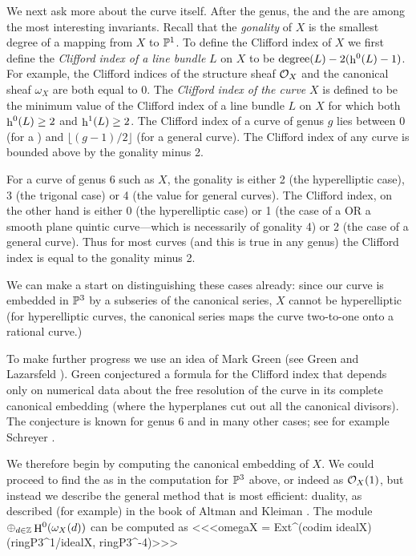 We next ask more about the curve itself. After the genus,
the  and the  are
among the most interesting invariants.
Recall that the
{\it gonality\/} of $X$ is the smallest degree of a mapping from
$X$ to $\P^1$. To define the Clifford index
of $X$ 
we first define the {\it Clifford index of a line bundle\/} $L$
on $X$ to be
$\mathop{\rm degree}(L)-2(\mathop{\rm h}\nolimits^0(L)-1)$.
{}For example, the Clifford indices of the structure sheaf
$\cO_X$ and the canonical sheaf $\omega_X$ are both equal to 0.
The {\it Clifford index of the curve\/} 
$X$ is defined to be the minimum value
of the Clifford index of a line bundle $L$
on $X$ for which both
$\mathop{\rm h}\nolimits^0(L)\geq 2$ and $\mathop{\rm h}\nolimits^1(L)\geq 2$. 
The Clifford index of a curve of genus $g$
lies between 0 (for a )
 and
$\lfloor (g-1)/2\rfloor$ (for a general curve).
The Clifford index of any curve is bounded above
by the gonality minus 2.

{}For a curve of genus 6 such as $X$, the gonality is either
2 (the hyperelliptic case), 3 (the trigonal case) or 4
(the value for general curves). The Clifford index, on the
other hand is either 0 (the hyperelliptic case) or 1
(the case of a 
 OR a smooth 
 plane quintic curve---which
is necessarily of gonality 4)
or 2 (the case of a general curve). Thus for most curves 
(and this is true in any genus)
the Clifford index is equal to the gonality minus 2.

We can make a start on distinguishing these cases already:
since our curve is embedded in $\P^3$ by a subseries of the
canonical series, $X$ cannot be hyperelliptic (for hyperelliptic
curves, the canonical series maps the curve two-to-one onto
a rational curve.)

To make further progress we use an idea of Mark Green
(see Green and Lazarsfeld \cite{gl}). Green conjectured a formula
{}for the Clifford index that depends only on
numerical data about the free resolution of the
curve in its complete canonical embedding (where the hyperplanes
cut out all the canonical divisors). 
The conjecture is known for genus 6 and
in many other cases; see for example Schreyer \cite{s}.

We therefore begin by 
computing the canonical embedding of $X$. We could proceed
to find the 
as in the computation for $\P^3$ above, or indeed
as $\cO_X(1)$, but instead we describe the general
method that is most efficient: duality, as described (for
example) in the book of Altman and Kleiman \cite{ak}. The 
module $\oplus_{d\in \Z}\mathop{\rm H}\nolimits^0(\omega_X(d))$ can be
computed as
<<<omegaX = Ext^(codim idealX)(ringP3^1/idealX, ringP3^{-4})>>>

